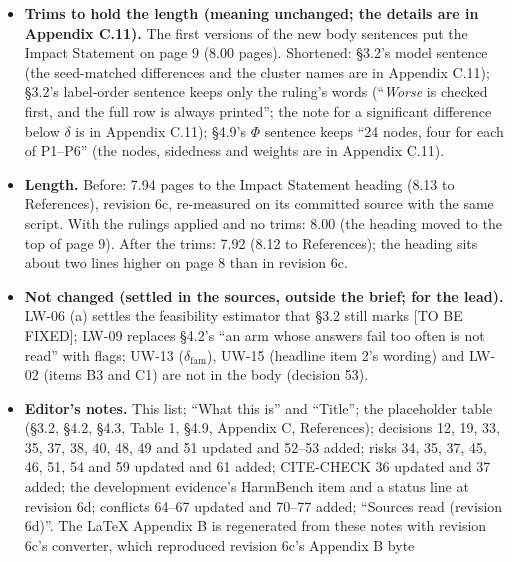 \documentclass{article}
\theoremstyle{plain}
\theoremstyle{definition}
\theoremstyle{remark}
\begin{document}
\begin{itemize}
        cross-family limit as risk 61. The body keeps its [PLANNED;
        funding-gated; first 7--8B model cut] marker and its citation of Team
        Olmo et al. (2025); nothing else is added to the body.
  \item \textbf{Trims to hold the length (meaning unchanged; the details are in
        Appendix C.11).} The first versions of the new body sentences put the
        Impact Statement on page 9 (8.00 pages). Shortened: \S{}3.2's model
        sentence (the seed-matched differences and the cluster names are in
        Appendix C.11); \S{}3.2's label-order sentence keeps only the ruling's
        words (``\emph{Worse} is checked first, and the full row is always
        printed''; the note for a significant difference below $\delta$ is in
        Appendix C.11); \S{}4.9's $\Phi$ sentence keeps ``24 nodes, four for
        each of P1--P6'' (the nodes, sidedness and weights are in Appendix
        C.11).
  \item \textbf{Length.} Before: 7.94 pages to the Impact Statement heading
        (8.13 to References), revision 6c, re-measured on its committed source
        with the same script. With the rulings applied and no trims: 8.00 (the
        heading moved to the top of page 9). After the trims: 7.92 (8.12 to
        References); the heading sits about two lines higher on page 8 than in
        revision 6c.
  \item \textbf{Not changed (settled in the sources, outside the brief; for the
        lead).} LW-06 (a) settles the feasibility estimator that \S{}3.2 still
        marks [TO BE FIXED]; LW-09 replaces \S{}4.2's ``an arm whose answers
        fail too often is not read'' with flags; UW-13
        ($\delta_{\mathrm{fam}}$), UW-15 (headline item 2's wording) and LW-02
        (items B3 and C1) are not in the body (decision 53).
  \item \textbf{Editor's notes.} This list; ``What this is'' and ``Title''; the
        placeholder table (\S{}3.2, \S{}4.2, \S{}4.3, Table 1, \S{}4.9, Appendix
        C, References); decisions 12, 19, 33, 35, 37, 38, 40, 48, 49 and 51
        updated and 52--53 added; risks 34, 35, 37, 45, 46, 51, 54 and 59
        updated and 61 added; CITE-CHECK 36 updated and 37 added; the
        development evidence's HarmBench item and a status line at revision 6d;
        conflicts 64--67 updated and 70--77 added; ``Sources read (revision
        6d)''. The LaTeX Appendix B is regenerated from these notes with
        revision 6c's converter, which reproduced revision 6c's Appendix B byte

\end{itemize}
\end{document}
